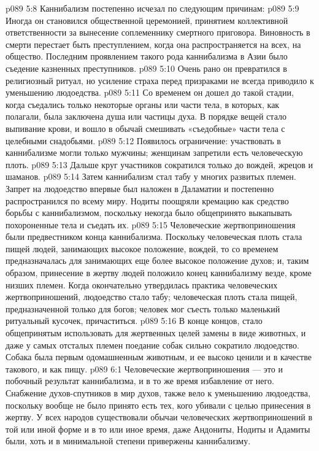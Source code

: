 \vs p089 5:8 \pc Каннибализм постепенно исчезал по следующим причинам:
\vs p089 5:9 \bibnobreakspace Иногда он становился общественной церемонией, принятием коллективной ответственности за вынесение соплеменнику смертного приговора. Виновность в смерти перестает быть преступлением, когда она распространяется на всех, на общество. Последним проявлением такого рода каннибализма в Азии было съедение казненных преступников.
\vs p089 5:10 \pc {}\bibnobreakspace Очень рано он превратился в религиозный ритуал, но усиление страха перед призраками не всегда приводило к уменьшению людоедства.
\vs p089 5:11 \pc {}\bibnobreakspace Со временем он дошел до такой стадии, когда съедались только некоторые органы или части тела, в которых, как полагали, была заключена душа или частицы духа. В порядке вещей стало выпивание крови, и вошло в обычай смешивать «съедобные» части тела с целебными снадобьями.
\vs p089 5:12 \pc {}\bibnobreakspace Появилось ограничение: участвовать в каннибализме могли только мужчины; женщинам запретили есть человеческую плоть.
\vs p089 5:13 \pc {}\bibnobreakspace Дальше круг участников сократился только до вождей, жрецов и шаманов.
\vs p089 5:14 \pc {}\bibnobreakspace Затем каннибализм стал табу у многих развитых племен. Запрет на людоедство впервые был наложен в Даламатии и постепенно распространился по всему миру. Нодиты поощряли кремацию как средство борьбы с каннибализмом, поскольку некогда было общепринято выкапывать похороненные тела и съедать их.
\vs p089 5:15 \pc {}\bibnobreakspace Человеческие жертвоприношения были предвестником конца каннибализма. Поскольку человеческая плоть стала пищей людей, занимающих высокое положение, вождей, то со временем предназначалась для занимающих еще более высокое положение духов; и, таким образом, принесение в жертву людей положило конец каннибализму везде, кроме низших племен. Когда окончательно утвердилась практика человеческих жертвоприношений, людоедство стало табу; человеческая плоть стала пищей, предназначенной только для богов; человек мог съесть только маленький ритуальный кусочек, причаститься.
\vs p089 5:16 \pc В конце концов, стало общепринятым использовать для жертвенных целей замены в виде животных, и даже у самых отсталых племен поедание собак сильно сократило людоедство. Собака была первым одомашненным животным, и ее высоко ценили и в качестве такового, и как пищу.
\vs p089 6:1 Человеческие жертвоприношения --- это и побочный результат каннибализма, и в то же время избавление от него. Снабжение духов\hyp{}спутников в мир духов, также вело к уменьшению людоедства, поскольку вообще не было принято есть тех, кого убивали с целью принесения в жертву. У всех народов существовали обычаи человеческих жертвоприношений в той или иной форме и в то или иное время, даже Андониты, Нодиты и Адамиты были, хоть и в минимальной степени привержены каннибализму.
